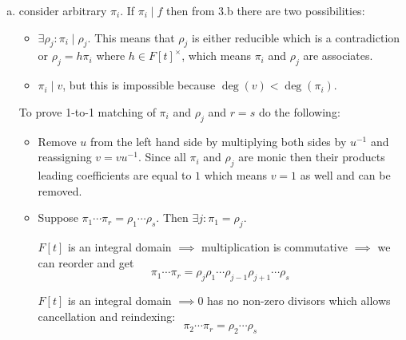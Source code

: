 \documentclass[12pt]{article}
\begin{document}
\begin{enumerate}
\begin{enumerate}[a)]
\begin{itemize}
                        $P(n)=\forall f \colon \deg(f) = n, NSTEPS(fact(f)) < \infty$

                        $P(1)$ is true since such $f$ are irreducible.

                        Assume $P(n)$ is true for all $n \leq N$. Prove for $N + 1$.

                        For arbitrary $f \colon \deg(f) = N+1, NSTEPS(fact(f))=1 \text{ if it's irreducible or } NSTEPS(fact(f))=NSTEPS(fact(g)) + NSTEPS(fact(h)) + 1 \text{ otheriwse } \implies P(N+1) true$.
                \end{itemize}
          \item consider arbitrary $\pi_i$. If $\pi_i \mid f$ then from 3.b there are two possibilities:
                \begin{itemize}
                  \item $\exists \rho_j \colon \pi_i \mid \rho_j$. This means that $\rho_j$ is either reducible which is a contradiction or $\rho_j=h\pi_i$ where $h \in {F[t]}^{\times}$, which means $\pi_i$ and $\rho_j$ are associates.
                  \item $\pi_i \mid v$, but this is impossible because $\deg(v) < \deg(\pi_i)$.
                \end{itemize}
                To prove 1-to-1 matching of $\pi_i$ and $\rho_j$ and $r=s$ do the following:
                \begin{itemize}
                  \item Remove $u$ from the left hand side by multiplying both sides by $u^{-1}$ and reassigning $v=vu^{-1}$. Since all $\pi_i$ and $\rho_j$ are monic then their products leading coefficients are equal to $1$ which means $v=1$ as well and can be removed.
                  \item Suppose $\pi_1 \cdots \pi_r = \rho_1 \cdots \rho_s$. Then $\exists j \colon \pi_1=\rho_j$.

                        $F[t]$ is an integral domain $\implies$ multiplication is commutative $\implies$ we can reorder and get
                        \[
                        \pi_1 \cdots \pi_r = \rho_j \rho_1 \cdots \rho_{j-1} \rho_{j+1} \cdots \rho_s
                        \]

                        $F[t]$ is an integral domain $\implies 0$ has no non-zero divisors which allows cancellation and reindexing:
                        \[
                        \pi_2 \cdots \pi_r = \rho_2 \cdots \rho_s
                        \]


\end{itemize}
\end{enumerate}
\end{enumerate}
\end{document}
